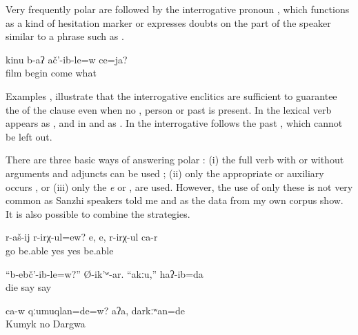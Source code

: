 Very frequently polar  are followed by the interrogative pronoun  , which functions as a kind of hesitation marker or expresses doubts on the part of the speaker similar to a phrase such as .
%
\begin{exe}
	\ex	\label{ex:‎‎‎Did the movie start or what}
	\gll	kinu	b-aʔ	ač'-ib-le=w	ce=ja?	\\
		film	begin	come	what\\
	\glt	{}
\end{exe}

Examples ,  illustrate that the interrogative enclitics are sufficient to guarantee the  of the clause even when no , person  or past  is present. In  the lexical verb appears as , and in  and  as . In  the interrogative  follows the past , which cannot be left out. 

There are three basic ways of answering polar : (i) the full verb with or without arguments and adjuncts can be used ; (ii) only the appropriate  or auxiliary occurs , or (iii) only the  \textit{e}  or ,   are used. However, the use of only these  is not very common as Sanzhi speakers told me and as the data from my own corpus show. It is also possible to combine the strategies.
%
\begin{exe}

	\ex	\label{ex:‎Is she able to walk}
	\gll	r-aš-ij	r-irχ-ul=ew? e,	e,	r-irχ-ul	ca-r\\
		go	be.able yes	yes	be.able	\\
	\glt	{}

	\ex	\label{ex:Did (the cow) die? he asked. No, I said}
	\gll	``b-ebč'-ib-le=w?'' Ø-ik'ʷ-ar.	``akːu,''	haʔ-ib=da\\
		die	say  say\\
	\glt	{}
	
	\ex	\label{ex:Was he himself Kumyk? No, Dargi}
	\gll	ca-w	qːumuqlan=de=w?	aʔa,	darkːʷan=de\\
			Kumyk 	no	Dargwa\\
	\glt	{}
\end{exe}

